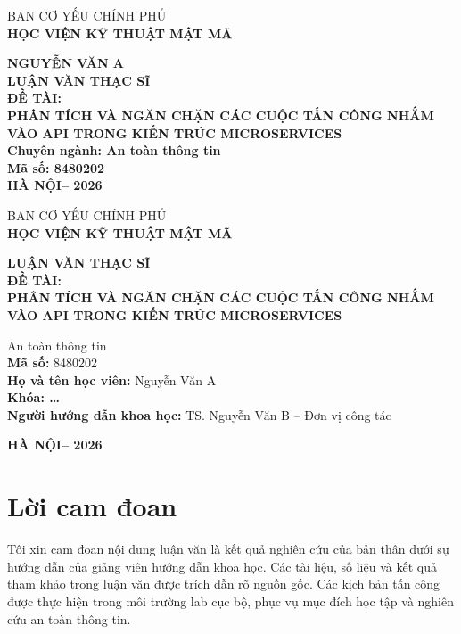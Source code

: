 \documentclass[14pt,a4paper]{extreport}
\newcommand{\studentname}{Nguyễn Văn A}
\newcommand{\studentclass}{Khóa: \ldots}
\newcommand{\major}{An toàn thông tin}
\newcommand{\majorcode}{8480202}
\newcommand{\supervisorone}{TS. Nguyễn Văn B -- Đơn vị công tác}
\newcommand{\city}{HÀ NỘI}
\newcommand{\yearnumber}{2026}
\newcommand{\thesistitle}{PHÂN TÍCH VÀ NGĂN CHẶN CÁC CUỘC TẤN CÔNG NHẮM VÀO API TRONG KIẾN TRÚC MICROSERVICES}
\newcommand{\coverHeader}{
  \begin{center}
    {\MakeUppercase{Ban Cơ yếu Chính phủ}}\\
    {\bfseries\MakeUppercase{Học viện Kỹ thuật Mật mã}}
  \end{center}
}
\begin{document}
\thispagestyle{empty}
\coverHeader
\vspace{2.8cm}
\begin{center}
  {\bfseries\MakeUppercase{\studentname}}\\[2.8cm]
  {\bfseries\fontsize{20pt}{24pt}\selectfont LUẬN VĂN THẠC SĨ}\\[0.8cm]
  {\bfseries ĐỀ TÀI:}\\[0.4cm]
  {\bfseries\MakeUppercase{\thesistitle}}\\[1.0cm]
  {\bfseries Chuyên ngành: \major}\\[0.3cm]
  {\bfseries Mã số: \majorcode}\\
  \vfill
  {\bfseries \city -- \yearnumber}
\end{center}
\newpage

\thispagestyle{empty}
\coverHeader
\vspace{2.2cm}
\begin{center}
  {\bfseries\fontsize{20pt}{24pt}\selectfont LUẬN VĂN THẠC SĨ}\\[0.8cm]
  {\bfseries ĐỀ TÀI:}\\[0.4cm]
  {\bfseries\MakeUppercase{\thesistitle}}\\[1.0cm]
\end{center}

 \major\\
{\bfseries Mã số:} \majorcode\\[0.4cm]
{\bfseries Họ và tên học viên:} \studentname\\
{\bfseries \studentclass}\\[0.4cm]
{\bfseries Người hướng dẫn khoa học:} \supervisorone

\vfill
\begin{center}
  {\bfseries \city -- \yearnumber}
\end{center}
\newpage


\chapter*{Lời cam đoan}
Tôi xin cam đoan nội dung luận văn là kết quả nghiên cứu của bản thân dưới sự hướng dẫn của giảng viên hướng dẫn khoa học. Các tài liệu, số liệu và kết quả tham khảo trong luận văn được trích dẫn rõ nguồn gốc. Các kịch bản tấn công được thực hiện trong môi trường lab cục bộ, phục vụ mục đích học tập và nghiên cứu an toàn thông tin.
\end{document}
